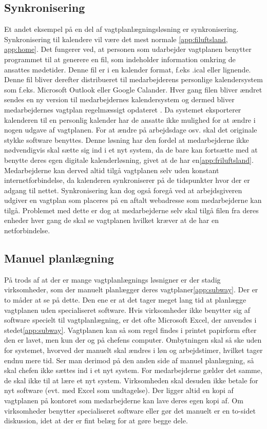 \subsection{Synkronisering}
Et andet eksempel på en del af vagtplanlægningsløsning er synkronisering. Synkronisering til kalendere vil være det mest normale \ref{app:filuftsland, app:home}. Det fungerer ved, at personen som udarbejder vagtplanen benytter programmet til at generere en fil, som indeholder information omkring de ansattes mødetider. Denne fil er i en kalender format, f.eks .ical eller lignende. Denne fil bliver derefter distribueret til medarbejderens personlige kalendersystem som f.eks. Microsoft Outlook eller Google Calander. Hver gang filen bliver ændret sendes en ny version til medarbejdernes kalendersystem og dermed bliver medarbejdernes vagtplan regelmæssigt opdateret \citep{stage2005}. Da systemet eksporterer kalenderen til en personlig kalender har de ansatte ikke mulighed for at ændre i nogen udgave af vagtplanen. For at ændre på arbejdsdage osv. skal det originale stykke software benyttes. Denne løsning har den fordel at medarbejderne ikke nødvendigvis skal sætte sig ind i et nyt system, da de bare kan fortsætte med at benytte deres egen digitale kalenderløsning, givet at de har en\ref{app:friluftsland}. Medarbejderne kan derved altid tilgå vagtplanen selv uden konstant internetforbindelse, da kalenderen synkroniserer på de tidspunkter hvor der er adgang til nettet. Synkronisering kan dog også foregå ved at arbejdsgiveren udgiver en vagtplan som placeres på en aftalt webadresse som medarbejderne kan tilgå. Problemet med dette er dog at medarbejderne selv skal tilgå filen fra deres enheder hver gang de skal se vagtplanen hvilket kræver at de har en netforbindelse.\\

\subsection{Manuel planlægning}
På trods af at der er mange vagtplanlægnings løsnigner er der stadig virksomheder, som der manuelt planlægger deres vagtplaner\ref{app:subway}. Der er to måder at se på dette. Den ene er at det tager meget lang tid at planlægge vagtplanen uden specialiseret software. Hvis virksomheder ikke benytter sig af software specielt til vagtplanlægning, er det ofte Microsoft Excel, der anvendes i stedet\ref{app:subway}. Vagtplanen kan så som regel findes i printet papirform efter den er lavet, men kun der og på chefens computer. Ombytningen skal så ske uden for systemet, hvorved der manuelt skal ændres i løn og arbejdstimer, hvilket tager endnu mere tid. Ser man derimod på den anden side af manuel planlægning, så skal chefen ikke sættes ind i et nyt system. For medarbejderne gælder det samme, de skal ikke til at lære et nyt system. Virksomheden skal desuden ikke betale for nyt software (evt. med Excel som undtagelse). Der ligger altid en kopi af vagtplanen på kontoret som medarbejderne kan lave deres egen kopi af. Om virksomheder benytter specialiseret software eller gør det manuelt er en to-sidet diskussion, idet at der er fint belæg for at gøre begge dele.


